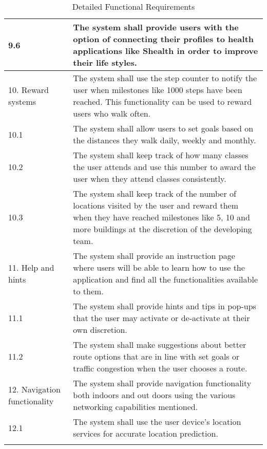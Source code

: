 \documentclass[12pt,a4paper]{report}
\begin{document}
\begin{longtable}{| p{} | p{} |}
\hline
9.6 & The system shall provide users with the option of connecting their profiles to health applications like Shealth in order to improve their life styles.\\
\hline
10. Reward systems & The system shall use the step counter to notify the user when milestones like 1000 steps have been reached. This functionality can be used to reward users who walk often.\\
\hline
10.1 & The system shall allow users to set goals based on the distances they walk daily, weekly and monthly. \\
\hline
10.2 & The system shall keep track of how many classes the user attends and use this number to award the user when they attend classes consistently.\\
\hline
10.3& The system  shall keep track of the number of locations visited by the user and reward them when they have reached milestones like 5, 10 and more buildings at the discretion of the developing team.\\
\hline
11. Help and hints &The system shall provide an instruction page where users will be able to learn how to use the application and find all the functionalities available to them.\\
\hline
11.1& The system shall provide hints and tips in pop-ups that the user may activate or de-activate at their own discretion.\\
\hline
11.2& The system shall make suggestions about better route options that are in line with set goals or traffic congestion when the user chooses a route.\\
\hline
12. Navigation functionality & The system shall provide navigation functionality both indoors and out doors using the various networking capabilities mentioned.\\
\hline
12.1 &The system shall use the user device's location services for accurate location prediction.\\
\hline


\caption{Detailed Functional Requirements} %
\label{tab:NavUP Functional Requirements}
\end{longtable}
\end{document}
